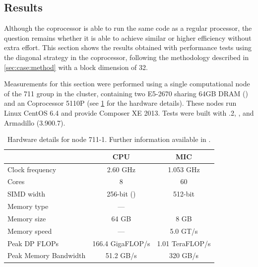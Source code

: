 \documentclass[../thesis]{subfiles}
\begin{document}
	\subsection{Results}
	\label{subsec:mic:native:results}

	Although the \intel\xeonphi coprocessor is able to run the same code as a regular \intel\xeon processor, the question remains whether it is able to achieve similar or higher efficiency without extra effort. This section shows the results obtained with performance tests using the diagonal strategy in the coprocessor, following the methodology described in \cref{sec:case:method} with a block dimension of 32.

	Measurements for this section were performed using a single computational node of the 711 group in the \search cluster, containing two \intel\xeon E5-2670 \cpus sharing 64GB DRAM (\numa) and an \intel\xeonphi Coprocessor 5110P (see \cref{tab:search:711} for the hardware details). These nodes run Linux CentOS 6.4 and provide \intel Composer XE 2013. Tests were built with .2, \mkl, and Armadillo (3.900.7).

	\begin{table}[!b]
		\centering
		\begin{tabular}{|l|c|c|}
			\hline
			& \textbf{CPU} & \textbf{MIC}  \\
			\hline
			Clock frequency & 2.60 GHz & 1.053 GHz  \\
			Cores & 8 & 60  \\
			SIMD width & 256-bit (\avx) & 512-bit  \\
			Memory type & --- & \gddr5  \\
			Memory size & 64 GB & 8 GB  \\
			Memory speed & --- & 5.0 GT/s  \\
			\hline
			Peak DP FLOPs & 166.4 GigaFLOP/s & 1.01 TeraFLOP/s  \\
			Peak Memory Bandwidth & 51.2 GB/s & 320 GB/s  \\ 
			\hline
		\end{tabular}
		\caption{Hardware details for \search node 711-1. Further information available in \cite{Intel:Xeon:e5_2670,Intel:Xeon:e5_2600,Intel:XeonPhi:5110P}.}
		\label{tab:search:711}
	\end{table}
\end{document}

